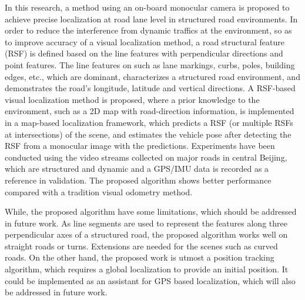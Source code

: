 \documentclass[letterpaper, 10 pt, conference]{ieeeconf}  %
\begin{document}
In this research, a method using an on-board monocular camera is proposed to achieve precise localization at road lane level in structured road environments. In order to reduce the interference from dynamic traffics at the environment, so as to improve accuracy of a visual localization method, a road structural feature (RSF) is defined based on the line features with perpendicular directions and point features. The line features on such as lane markings, curbs, poles, building edges, etc., which are dominant, characterizes a structured road environment, and demonstrates the road's longitude, latitude and vertical directions.
A RSF-based visual localization method is proposed, where a prior knowledge to the environment, such as a 2D map with road-direction information, is implemented in a map-based localization framework, which predicts a RSF (or multiple RSFs at intersections) of the scene, and  estimates the vehicle pose after detecting the RSF from a monocular image with the predictions.
Experiments have been conducted using the video streams collected on major roads in central Beijing, which are structured and dynamic and a GPS/IMU data is recorded as a reference in validation.
The proposed algorithm shows better performance compared with a tradition visual odometry method.

While, the proposed algorithm have some limitations, which should be addressed in future work. As line segments are used to represent the features along three perpendicular axes of a structured road, the proposed algorithm works well on straight roads or turns. Extensions are needed for the scenes such as curved roads. On the other hand, the proposed work is utmost a position tracking algorithm, which requires a global localization to provide an initial position. It could be implemented as an assistant for GPS based localization, which will also be addressed in future work.



\end{document}
